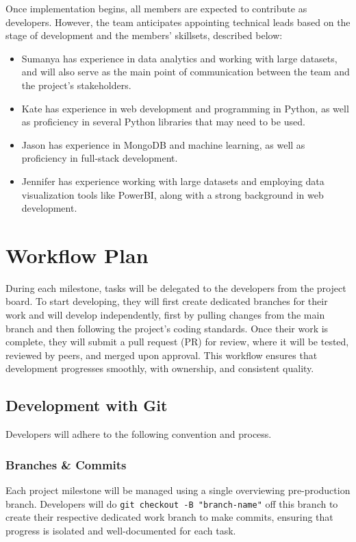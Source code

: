 \documentclass{article}
\begin{document}
\noindent Once implementation begins, all members are expected to contribute as developers.
However, the team anticipates appointing technical leads based on the stage of development and the members' skillsets, 
described below:

\begin{itemize}
  \item Sumanya has experience in data analytics and working with large datasets,
  and will also serve as the main point of communication between the team and the project's
  stakeholders.
  \item Kate has experience in web development and programming in Python, as well
  as proficiency in several Python libraries that may need to be used.
  \item Jason has experience in MongoDB and machine learning, as well as proficiency
  in full-stack development.
  \item Jennifer has experience working with large datasets and employing data
  visualization tools like PowerBI, along with a strong background in web development.
\end{itemize}

\section{Workflow Plan}

During each milestone, tasks will be delegated to the developers from the project board. To start developing, they will first create dedicated branches for their work and will develop independently, first by pulling changes from the main branch and then following the project's coding standards. Once their work is complete, they will submit a pull request (PR) for review, where it will be tested, reviewed by peers, and merged upon approval. This workflow ensures that development progresses smoothly, with ownership, and consistent quality.

\subsection{Development with Git}

Developers will adhere to the following convention and process.

\subsubsection{Branches \& Commits}

Each project milestone will be managed using a single overviewing pre-production
branch. Developers will do \texttt{git checkout -B "branch-name"} off this branch to create their respective 
dedicated work branch to make commits, ensuring that progress is isolated 
and well-documented for each task.
\end{document}
